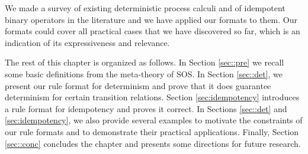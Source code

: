 We made a survey of existing deterministic process calculi and
of idempotent binary operators in the literature and we have applied our formats to them.
Our formats could cover all practical cases that we have discovered so far,
which is an indication of its expressiveness and relevance.

The rest of this chapter is organized as follows. In Section \ref{sec::pre} we recall some basic definitions from the meta-theory of SOS.
In Section \ref{sec::det}, we present our rule format for determinism and prove that it does guarantee determinism for certain transition relations.
Section \ref{sec:idempotency} introduces a rule format for idempotency and proves it correct.
In Sections \ref{sec::det} and \ref{sec:idempotency},  we also provide several examples to motivate
the constraints of our rule formats and to demonstrate their practical applications.
Finally, Section \ref{sec::conc} concludes the chapter and presents some directions for future research. 